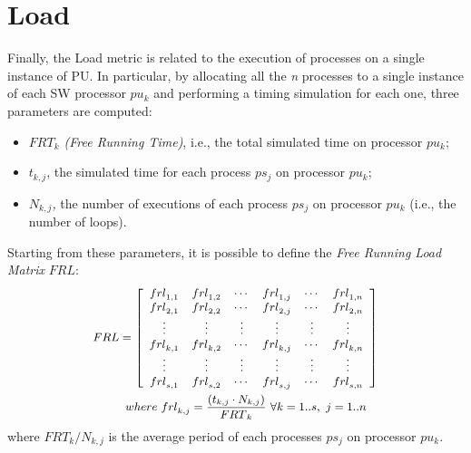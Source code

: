 \section{Load}\label{load_metric}
%
Finally, the Load metric is related to the execution of processes on a single instance of PU. In particular, by allocating all the \textit{n} processes to a single instance of each SW processor $pu_{k}$ and performing a timing simulation for each one,  three parameters are computed: 
%
\begin{itemize}
    \item \textit{$FRT_{k}$ (Free Running Time)}, i.e., the total simulated time on processor $pu_{k}$;
    \item \textit{$t_{k,j}$}, the simulated time for each process \textit{$ps_{j}$} on processor \textit{$pu_{k}$};
    \item \textit{$N_{k,j}$,} the number of executions of each process \textit{$ps_{j}$} on processor \textit{$pu_{k}$} (i.e., the number of loops).
\end{itemize}
%
Starting from these parameters, it is possible to define the \textit{Free Running Load Matrix} \textit{$FRL$}:
%
\begin{equation} \label{eq12}
\small
\begin{aligned}
{FRL} = \left[  
\begin{array}{cccccc}
{frl}_{1,1} & {frl}_{1,2} & \cdots  & {frl}_{1,j} & \cdots & {frl}_{1,n} \\ 
{frl}_{2,1} & {frl}_{2,2} & \cdots  & {frl}_{2,j} & \cdots & {frl}_{2,n} \\ 
\vdots 			& \vdots 		  & \vdots  & \vdots 		  & \vdots & \vdots 		 \\ 
{frl}_{k,1} & {frl}_{k,2} & \cdots  & {frl}_{k,j} & \cdots & {frl}_{k,n} \\
\vdots  		& \vdots 		  & \vdots  & \vdots 		  & \vdots & \vdots 		 \\ 
{frl}_{s,1} & {frl}_{s,2} & \cdots  & {frl}_{s,j} & \cdots & {frl}_{s,n} \\
\end{array}
\right]  \\
where \ {frl}_{k,j} =\frac{\left(t_{k,j} \cdot N_{k,j}\right)}{{FRT}_k} \ \forall  k=1..s, \ j=1..n \ \ \ 
\end{aligned}
\end{equation}
%
where \textit{${FRT}_{k}/N_{k,j}$} is the average period of each processes \textit{$ps_{j}$} on processor \textit{$pu_{k}$}. 
%
